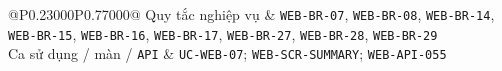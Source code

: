 \begin{longtable}{@{}P{0.23000\SRSWidth}P{0.77000\SRSWidth}@{}}
Quy tắc nghiệp vụ & \texttt{WEB-\allowbreak{}BR-\allowbreak{}07}, \texttt{WEB-\allowbreak{}BR-\allowbreak{}08}, \texttt{WEB-\allowbreak{}BR-\allowbreak{}14}, \texttt{WEB-\allowbreak{}BR-\allowbreak{}15}, \texttt{WEB-\allowbreak{}BR-\allowbreak{}16}, \texttt{WEB-\allowbreak{}BR-\allowbreak{}17}, \texttt{WEB-\allowbreak{}BR-\allowbreak{}27}, \texttt{WEB-\allowbreak{}BR-\allowbreak{}28}, \texttt{WEB-\allowbreak{}BR-\allowbreak{}29} \\[3pt]
Ca sử dụng /\allowbreak{} màn /\allowbreak{} \texttt{API} & \texttt{UC-\allowbreak{}WEB-\allowbreak{}07}; \texttt{WEB-\allowbreak{}SCR-\allowbreak{}SUMMARY}; \texttt{WEB-\allowbreak{}API-\allowbreak{}055} \\[3pt]
\end{longtable}
\endgroup

